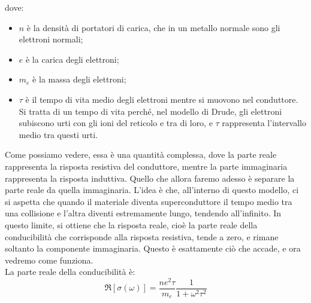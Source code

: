 dove:
\begin{itemize}[leftmargin=0.5cm]
   \item $n$ è la densità di portatori di carica, che in un metallo normale sono gli elettroni normali;
   \item $e$ è la carica degli elettroni;
   \item $m_e$ è la massa degli elettroni;
   \item $\tau$ è il tempo di vita medio degli elettroni mentre si muovono nel conduttore. Si tratta di un tempo di vita perché, nel modello di Drude, gli elettroni subiscono urti con gli ioni del reticolo e tra di loro, e $\tau$ rappresenta l'intervallo medio tra questi urti.
\end{itemize}
Come possiamo vedere, essa è una quantità complessa, dove la parte reale rappresenta la risposta resistiva del conduttore, mentre la parte immaginaria rappresenta la risposta induttiva. Quello che allora faremo adesso è separare la parte reale da quella immaginaria. L'idea è che, all'interno di questo modello, ci si aspetta che quando il materiale diventa superconduttore il tempo medio tra una collisione e l'altra diventi estremamente lungo, tendendo all'infinito. In questo limite, si ottiene che la risposta reale, cioè la parte reale della conducibilità che corrisponde alla risposta resistiva, tende a zero, e rimane soltanto la componente immaginaria. Questo è esattamente ciò che accade, e ora vedremo come funziona.\\
La parte reale della conducibilità è:
\begin{equation*}
   \Re [ \sigma(\omega) ]
   =\frac{n e^2 \tau}{m_e} \frac{1}{1 + \omega^2 \tau^2}
\end{equation*}
